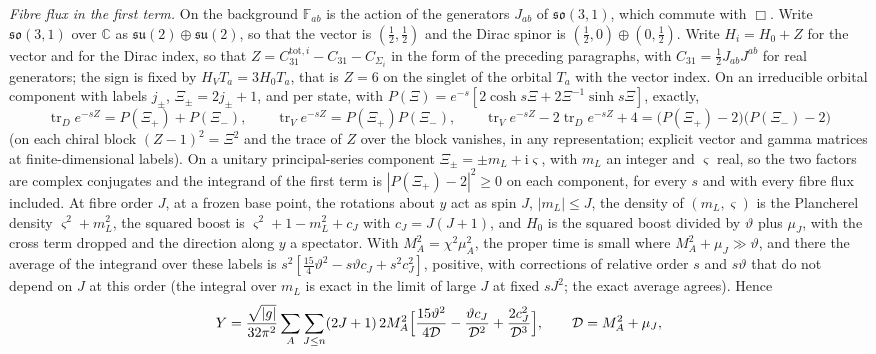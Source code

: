 \emph{Fibre flux in the first term.} On the background \(\mathbb F_{ab}\) is the action of the generators \(J_{ab}\) of \(\mathfrak{so}(3,1)\), which commute with \(\Box\). Write \(\mathfrak{so}(3,1)\) over \(\mathbb C\) as \(\mathfrak{su}(2)\oplus\mathfrak{su}(2)\), so that the vector is \((\tfrac12,\tfrac12)\) and the Dirac spinor is \((\tfrac12,0)\oplus(0,\tfrac12)\). Write \(H_i=H_0+Z\) for the vector and for the Dirac index, so that \(Z=C_{31}^{\mathrm{tot},i}-C_{31}-C_{\Sigma_i}\) in the form of the preceding paragraphs, with \(C_{31}=\tfrac12J_{ab}J^{ab}\) for real generators; the sign is fixed by \(H_VT_a=3H_0T_a\), that is \(Z=6\) on the singlet of the orbital \(T_a\) with the vector index. On an irreducible orbital component with labels \(j_\pm\), \(\Xi_\pm=2j_\pm+1\), and per state, with \(P(\Xi)=e^{-s}[2\cosh s\Xi+2\Xi^{-1}\sinh s\Xi]\), exactly,
\[
\operatorname{tr}_De^{-sZ}=P(\Xi_+)+P(\Xi_-),\qquad
\operatorname{tr}_Ve^{-sZ}=P(\Xi_+)P(\Xi_-),\qquad
\operatorname{tr}_Ve^{-sZ}-2\operatorname{tr}_De^{-sZ}+4=\bigl(P(\Xi_+)-2\bigr)\bigl(P(\Xi_-)-2\bigr)
\]
(on each chiral block \((Z-1)^2=\Xi^2\) and the trace of \(Z\) over the block vanishes, in any representation; explicit vector and gamma matrices at finite-dimensional labels). On a unitary principal-series component \(\Xi_\pm=\pm m_L+\mathrm i\varsigma\), with \(m_L\) an integer and \(\varsigma\) real, so the two factors are complex conjugates and the integrand of the first term is \(|P(\Xi_+)-2|^2\ge0\) on each component, for every \(s\) and with every fibre flux included. At fibre order \(J\), at a frozen base point, the rotations about \(y\) act as spin \(J\), \(|m_L|\le J\), the density of \((m_L,\varsigma)\) is the Plancherel density \(\varsigma^2+m_L^2\), the squared boost is \(\varsigma^2+1-m_L^2+c_J\) with \(c_J=J(J+1)\), and \(H_0\) is the squared boost divided by \(\vartheta\) plus \(\mu_J\), with the cross term dropped and the direction along \(y\) a spectator. With \(M_A^2=\chi^2\mu_A^2\), the proper time is small where \(M_A^2+\mu_J\gg\vartheta\), and there the average of the integrand over these labels is \(s^2[\tfrac{15}4\vartheta^2-s\vartheta c_J+s^2c_J^2]\), positive, with corrections of relative order \(s\) and \(s\vartheta\) that do not depend on \(J\) at this order (the integral over \(m_L\) is exact in the limit of large \(J\) at fixed \(sJ^2\); the exact average agrees). Hence
\[
Y=\frac{\sqrt{|g|}}{32\pi^2}\sum_A\sum_{J\le n}(2J+1)\,2M_A^2\Bigl[\frac{15\vartheta^2}{4\mathcal D}-\frac{\vartheta c_J}{\mathcal D^2}+\frac{2c_J^2}{\mathcal D^3}\Bigr],\qquad\mathcal D=M_A^2+\mu_J,
\]
